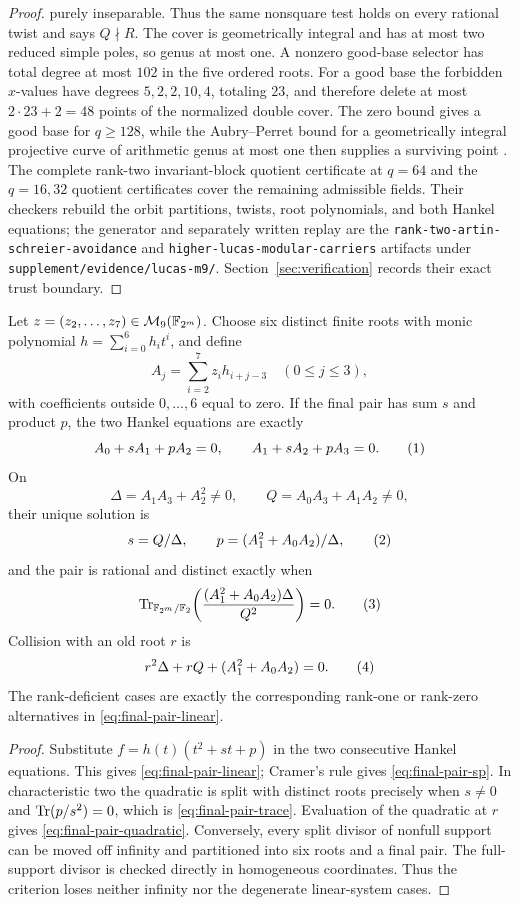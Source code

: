\begin{proof}
purely inseparable.  Thus the same nonsquare test holds on every rational
twist and says \(Q\nmid R\).  The cover is geometrically integral and has at
most two reduced simple poles, so genus at most one.  A nonzero good-base
selector has total degree at most \(102\) in the five ordered roots.  For a
good base the forbidden
\(x\)-values have degrees \(5,2,2,10,4\), totaling \(23\), and therefore
delete at most \(2\cdot23+2=48\) points of the normalized double cover.  The
zero bound gives a good base for \(q\ge128\), while the Aubry--Perret bound for
a geometrically integral projective curve of arithmetic genus at most one then
supplies a surviving point \cite[p.~468]{AubryPerret1995}.
The complete rank-two invariant-block quotient certificate at $q=64$ and the
$q=16,32$ quotient certificates cover the remaining admissible fields.
Their checkers rebuild
the orbit partitions, twists, root polynomials, and both Hankel equations;
the generator and separately written replay are the
\texttt{rank-two-artin-schreier-avoidance} and
\texttt{higher-lucas-modular-carriers} artifacts under
\texttt{supplement/evidence/lucas-m9/}.  Section~\ref{sec:verification}
records their exact trust boundary.
\end{proof}

\begin{proposition}\label{prop:final-pair}%
%
Let $z=(z_2,\ldots,z_7)\in\mathcal M_9(\mathbb F_{2^m})$.  Choose six distinct
finite roots with monic polynomial $h=\sum_{i=0}^6h_it^i$, and define
\[
 A_j=\sum_{i=2}^7z_i h_{i+j-3}\quad(0\leq j\leq3),
\]
with coefficients outside $0,\ldots,6$ equal to zero.  If the final
pair has sum $s$ and product $p$, the two Hankel equations are exactly
\[
 A_0+sA_1+pA_2=0,\qquad A_1+sA_2+pA_3=0.
 \autoeqtag{eq:final-pair-linear}
\]
On
\[
 \Delta=A_1A_3+A_2^2\ne0,\qquad
 Q=A_0A_3+A_1A_2\ne0,
\]
their unique solution is
\[
 s=Q/\Delta,\qquad p=(A_1^2+A_0A_2)/\Delta,
 \autoeqtag{eq:final-pair-sp}
\]
and the pair is rational and distinct exactly when
\[
 \Tr_{\F_{2^m}/\F_2}\!
 \left(\frac{(A_1^2+A_0A_2)\Delta}{Q^2}\right)=0.
 \autoeqtag{eq:final-pair-trace}
\]
Collision with an old root $r$ is
\[
 r^2\Delta+rQ+(A_1^2+A_0A_2)=0.
 \autoeqtag{eq:final-pair-quadratic}
\]
The rank-deficient cases are exactly the corresponding rank-one or
rank-zero alternatives in \eqref{eq:final-pair-linear}.
\end{proposition}

\begin{proof}
Substitute $f=h(t)(t^2+st+p)$ in the two consecutive Hankel equations.
This gives \eqref{eq:final-pair-linear}; Cramer's rule gives
\eqref{eq:final-pair-sp}.  In characteristic two the
quadratic is split with distinct roots precisely when $s\ne0$ and
$\operatorname{Tr}(p/s^2)=0$, which is \eqref{eq:final-pair-trace}.  Evaluation of the
quadratic at $r$ gives \eqref{eq:final-pair-quadratic}.  Conversely, every
split divisor of nonfull support can be
moved off infinity and partitioned into six roots and a final pair.
The full-support divisor is checked directly in homogeneous coordinates.
Thus the criterion loses neither infinity nor the degenerate linear-system
cases.
\end{proof}

